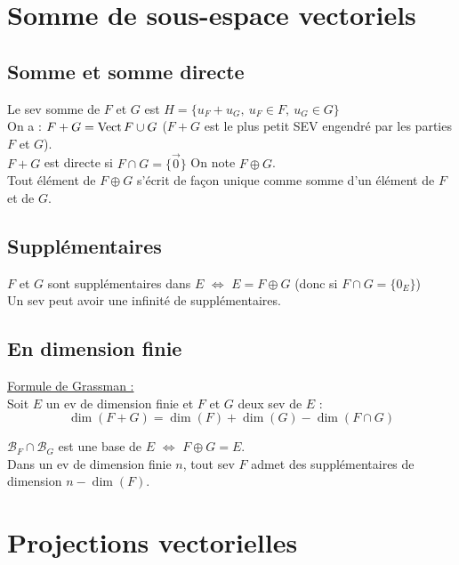 \section{Somme de sous-espace vectoriels}\label{sec:somme-de-sous-espace-vectoriels}

    \subsection{Somme et somme directe}\label{subsec:somme-et-somme-directe}

        Le sev somme de $F$ et $G$ est $H = \{u_F + u_G,\ u_F \in F,\ u_G \in G\}$\\

        On a : $F + G = \operatorname{Vect}{F \cup G}$ ($F + G$ est le plus petit SEV engendré par les parties $F$ et $G$).\\
        $F + G$ est directe si $F \cap G = \{\vec 0 \}$ On note $F \oplus G$.\\
        Tout élément de $F \oplus G$ s'écrit de façon unique comme somme d'un élément de $F$ et de $G$.

    \subsection{Supplémentaires}\label{subsec:supplementaires}
        $F$ et $G$ sont supplémentaires dans $E$ $\iff$ $E = F \oplus G$ (donc si $F \cap G = \{0_E\}$)\\

        Un sev peut avoir une infinité de supplémentaires.

    \subsection{En dimension finie}\label{subsec:en-dimension-finie}

        \underline{Formule de Grassman :}\\
        Soit $E$ un ev de dimension finie et $F$ et $G$ deux sev de $E$ :
        \[\dim(F + G) = \dim(F) + \dim(G) - \dim(F \cap G)\]

        $\mathcal{B}_F \cap \mathcal{B}_G$ est une base de $E$ $\iff$ $F \oplus G = E$.\\
        Dans un ev de dimension finie $n$, tout sev $F$ admet des supplémentaires de dimension $n - \dim(F)$.


\section{Projections vectorielles}\label{sec:projections-vectorielles}

